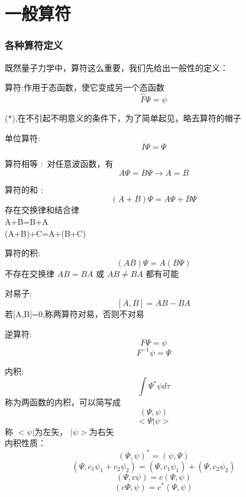 \section{一般算符}

\begin{frame} [allowframebreaks=]
    \frametitle{各种算符定义}
    既然量子力学中，算符这么重要，我们先给出一般性的定义：
    \begin{definition}
        算符:作用于态函数，使它变成另一个态函数
        $$ \hat{F} \Psi=\psi$$
    \end{definition}
    (*),在不引起不明意义的条件下，为了简单起见，略去算符的帽子
    \begin{definition}
        单位算符:
        $$ I\Psi=\Psi $$
    \end{definition}
    \begin{definition}
        算符相等 : 对任意波函数，有
        $$ A\Psi=B\Psi \to A=B $$
    \end{definition}
    \begin{definition}
        算符的和 : 
        $$ (A+B)\Psi=A\Psi+B\Psi $$
        存在交换律和结合律\\
        A+B=B+A\\
        (A+B)+C=A+(B+C)
    \end{definition}
    \begin{definition}
        算符的积: 
        $$ (AB)\Psi=A(B\Psi) $$
        不存在交换律
        $AB=BA$ 或 $AB\ne BA$ 都有可能
    \end{definition}
    \begin{definition}
        对易子: 
        $$ [A,B]=AB-BA$$
        若[A,B]=0,称两算符对易，否则不对易
    \end{definition}
    \begin{definition}
        逆算符: 
        $$ F\Psi=\psi $$
        $$ F^{-1}\psi=\Psi $$
    \end{definition}
    \begin{definition}
        内积: 
        $$ \int\Psi^*\psi d \tau$$
        称为两函数的内积，可以简写成
        $$ (\Psi,\psi)$$ 
        $$ <\Psi|\psi>$$
        称 $ <\psi|$为左矢， $|\psi>$为右矢\\
        内积性质：
        $$ (\Psi,\psi)^*=(\psi,\Psi)$$ 
        $$ (\Psi,c_1\psi_1+c_2\psi_2)=(\Psi,c_1\psi_1)+(\Psi,c_2\psi_2)$$ 
        $$ (\Psi,c\psi)=c(\Psi,\psi)$$ 
        $$ (c\Psi,\psi)=c^*(\Psi,\psi)$$ 
    \end{definition} 
    \begin{definition}

\end{definition}
\end{frame}
